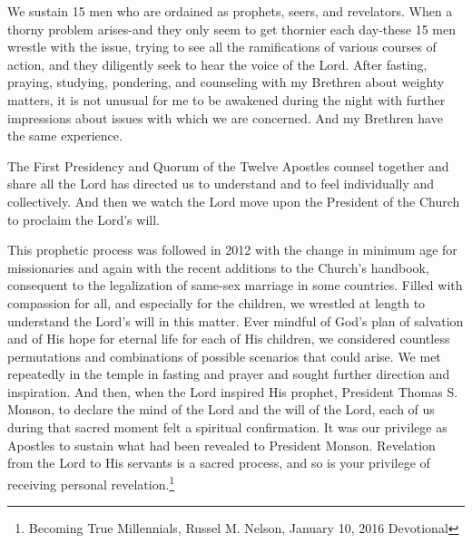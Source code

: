\begin{displayquote}
We sustain 15 men who are ordained as prophets, seers, and revelators. When a thorny 
problem arises-and they only seem to get thornier each day-these 15 men wrestle with 
the issue, trying to see all the ramifications of various courses of action, and they 
diligently seek to hear the voice of the Lord. After fasting, praying, studying, 
pondering, and counseling with my Brethren about weighty matters, it is not unusual 
for me to be awakened during the night with further impressions about issues with 
which we are concerned. And my Brethren have the same experience.

The First Presidency and Quorum of the Twelve Apostles counsel together and share 
all the Lord has directed us to understand and to feel individually and collectively. 
And then we watch the Lord move upon the President of the Church to proclaim the 
Lord's will.

This prophetic process was followed in 2012 with the change in minimum age for 
missionaries and again with the recent additions to the Church's handbook, 
consequent to the legalization of same-sex marriage in some countries. Filled with 
compassion for all, and especially for the children, we wrestled at length to 
understand the Lord’s will in this matter. Ever mindful of God's plan of salvation 
and of His hope for eternal life for each of His children, we considered countless 
permutations and combinations of possible scenarios that could arise. We met 
repeatedly in the temple in fasting and prayer and sought further direction and 
inspiration. And then, when the Lord inspired His prophet, President Thomas S. 
Monson, to declare the mind of the Lord and the will of the Lord, each of us during 
that sacred moment felt a spiritual confirmation. It was our privilege as Apostles 
to sustain what had been revealed to President Monson. Revelation from the Lord to 
His servants is a sacred process, and so is your privilege of receiving personal 
revelation.\footnote{Becoming True Millennials, Russel M. Nelson, January 10, 2016 
Devotional}
\end{displayquote}
